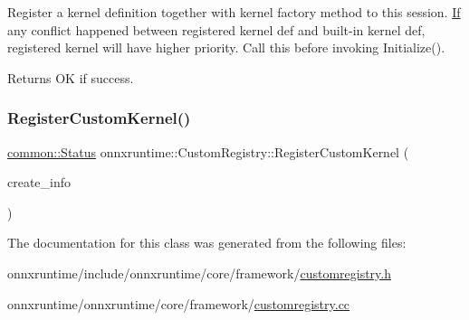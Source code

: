 Register a kernel definition together with kernel factory method to this session. \mbox{\hyperlink{classonnxruntime_1_1If}{If}} any conflict happened between registered kernel def and built-\/in kernel def, registered kernel will have higher priority. Call this before invoking Initialize(). \begin{DoxyReturn}{Returns}
OK if success. 
\end{DoxyReturn}
\mbox{\label{classonnxruntime_1_1CustomRegistry_ab931a32b12dd5193f5354f1f89b6e10f}} 
\subsubsection{\texorpdfstring{Register\+Custom\+Kernel()}{RegisterCustomKernel()}\hspace{0.1cm}{\footnotesize\ttfamily [2/2]}}
{\footnotesize\ttfamily \mbox{\hyperlink{classonnxruntime_1_1common_1_1Status}{common\+::\+Status}} onnxruntime\+::\+Custom\+Registry\+::\+Register\+Custom\+Kernel (\begin{DoxyParamCaption}\item[{\mbox{\hyperlink{structonnxruntime_1_1KernelCreateInfo}{Kernel\+Create\+Info}} \&}]{create\+\_\+info }\end{DoxyParamCaption})}



The documentation for this class was generated from the following files\+:\begin{DoxyCompactItemize}
\item 
onnxruntime/include/onnxruntime/core/framework/\mbox{\hyperlink{customregistry_8h}{customregistry.\+h}}\item 
onnxruntime/onnxruntime/core/framework/\mbox{\hyperlink{customregistry_8cc}{customregistry.\+cc}}\end{DoxyCompactItemize}
